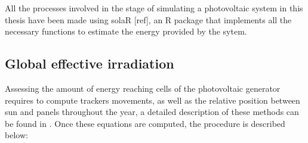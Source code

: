 All the processes involved in the stage of simulating a photovoltaic system in this thesis have been made using solaR [ref], an R package that implements all the necessary functions to estimate the energy provided by the sytem.

\subsection{Global effective irradiation}

Assessing the amount of energy reaching cells of the photovoltaic generator requires to compute trackers movements, as well as the relative position between sun and panels throughout the year, a detailed description of these methods can be found in \citep{Perpinan.Marcos.ea2013}.  Once these equations are computed, the procedure is described below:


